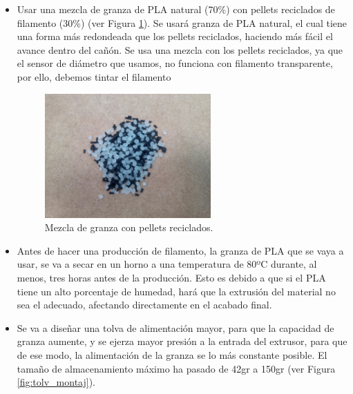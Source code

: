 \begin{itemize}
    \item{Usar una mezcla de granza de PLA natural (70\%) con pellets reciclados de filamento (30\%) (ver Figura \ref{fig:2007105-mezc}). Se usará granza de PLA natural, el cual tiene una forma más redondeada que los pellets reciclados, haciendo más fácil el avance dentro del cañón. Se usa una mezcla con los pellets reciclados, ya que el sensor de diámetro que usamos, no funciona con filamento transparente, por ello, debemos tintar el filamento}
	    \begin{figure}[H]
		    \centering
		    \includegraphics[width=0.6\textwidth]{images/producciones/20072015/IMG_20150903_155859.jpg}
		    \caption{Mezcla de granza con pellets reciclados.}
		    \label{fig:2007105-mezc}
		\end{figure}
    \item{Antes de hacer una producción de filamento, la granza de PLA que se vaya a usar, se va a secar en un horno a una temperatura de 80ºC durante, al menos, tres horas antes de la producción. Esto es debido a que si el PLA tiene un alto porcentaje de humedad, hará que la extrusión del material no sea el adecuado, afectando directamente en el acabado final.}
    \item{Se va a diseñar una tolva de alimentación mayor, para que la capacidad de granza aumente, y se ejerza mayor presión a la entrada del extrusor, para que de ese modo, la alimentación de la granza se lo más constante posible. El tamaño de almacenamiento máximo ha pasado de 42gr a 150gr (ver Figura \ref{fig:tolv_montaj}).}
\end{itemize}

